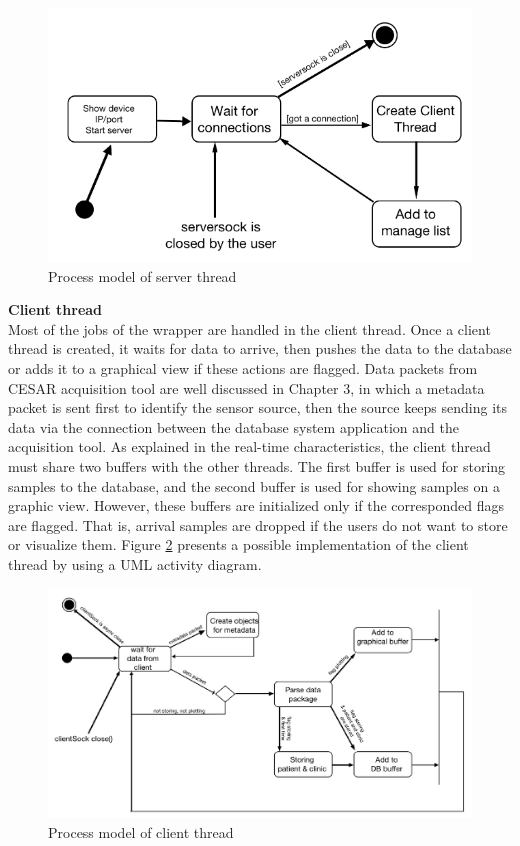 \begin{figure}
    \centering
    \includegraphics[width=1.0\textwidth]{Figures/ServerActivity.png}
    \caption{Process model of server thread}
    \label{fig:Figures/ServerActivity}
\end{figure}
\textbf{Client thread}\\
Most of the jobs of the wrapper are handled in the client thread. Once a client thread is created, it waits for data to arrive, then pushes the data to the database or adds it to a graphical view if these actions are flagged. Data packets from CESAR acquisition tool are well discussed in Chapter 3, in which a metadata packet is sent first to identify the sensor source, then the source keeps sending its data via the connection between the database system application and the acquisition tool. As explained in the real-time characteristics, the client thread must share two buffers with the other threads. The first buffer is used for storing samples to the database, and the second buffer is used for showing samples on a graphic view. However, these buffers are initialized only if the corresponded flags are flagged. That is, arrival samples are dropped if the users do not want to store or visualize them. Figure \ref{fig:Figures/ClientThreadAc} presents a possible implementation of the client thread by using a UML activity diagram.\\
\begin{figure}
    \centering
    \includegraphics[width=1.0\textwidth]{Figures/ClientThreadAc.png}
    \caption{Process model of client thread}
    \label{fig:Figures/ClientThreadAc}
\end{figure}
